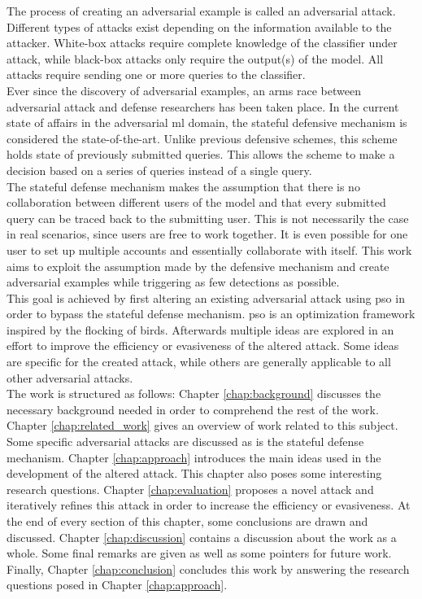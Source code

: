 The process of creating an adversarial example is called an adversarial attack. Different types of attacks exist depending on the information available to the attacker. White-box attacks require complete knowledge of the classifier under attack, while black-box attacks only require the output(s) of the model. All attacks require sending one or more queries to the classifier.\\

Ever since the discovery of adversarial examples, an arms race between adversarial attack and defense researchers has been taken place. In the current state of affairs in the adversarial \gls{ml} domain, the stateful defensive mechanism \cite{chen_stateful_2019} is considered the state-of-the-art. Unlike previous defensive schemes, this scheme holds state of previously submitted queries. This allows the scheme to make a decision based on a series of queries instead of a single query.\\

The stateful defense mechanism makes the assumption that there is no collaboration between different users of the model and that every submitted query can be traced back to the submitting user. This is not necessarily the case in real scenarios, since users are free to work together. It is even possible for one user to set up multiple accounts and essentially collaborate with itself. This work aims to exploit the assumption made by the defensive mechanism and create adversarial examples while triggering as few detections as possible.\\

This goal is achieved by first altering an existing adversarial attack using \gls{pso} in order to bypass the stateful defense mechanism. \gls{pso} is an optimization framework inspired by the flocking of birds. Afterwards multiple ideas are explored in an effort to improve the efficiency or evasiveness of the altered attack. Some ideas are specific for the created attack, while others are generally applicable to all other adversarial attacks.\\

The work is structured as follows: Chapter \ref{chap:background} discusses the necessary background needed in order to comprehend the rest of the work. Chapter \ref{chap:related_work} gives an overview of work related to this subject. Some specific adversarial attacks are discussed as is the stateful defense mechanism. Chapter \ref{chap:approach} introduces the main ideas used in the development of the altered attack. This chapter also poses some interesting research questions. Chapter \ref{chap:evaluation} proposes a novel attack and iteratively refines this attack in order to increase the efficiency or evasiveness. At the end of every section of this chapter, some conclusions are drawn and discussed. Chapter \ref{chap:discussion} contains a discussion about the work as a whole. Some final remarks are given as well as some pointers for future work. Finally, Chapter \ref{chap:conclusion} concludes this work by answering the research questions posed in Chapter \ref{chap:approach}. \\ 